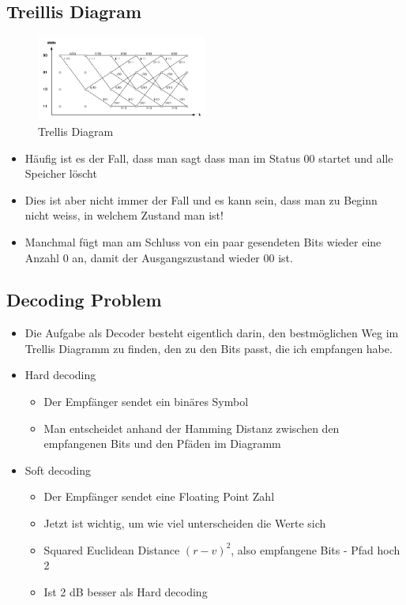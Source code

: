 \hypertarget{treillis-diagram}{%
\subsection{Treillis Diagram}\label{treillis-diagram}}

\begin{figure}[H]
\centering
\includegraphics[width=0.5\textwidth]{figures/trellis_diagram.png}
\caption{Trellis Diagram}
\end{figure}

\begin{itemize}
\tightlist
\item
  Häufig ist es der Fall, dass man sagt dass man im Status $00$ startet
  und alle Speicher löscht
\item
  Dies ist aber nicht immer der Fall und es kann sein, dass man zu
  Beginn nicht weiss, in welchem Zustand man ist!
\item
  Manchmal fügt man am Schluss von ein paar gesendeten Bits wieder eine
  Anzahl $0$ an, damit der Ausgangszustand wieder $00$ ist.
\end{itemize}

\hypertarget{decoding-problem}{%
\subsection{Decoding Problem}\label{decoding-problem}}

\begin{itemize}
\tightlist
\item
  Die Aufgabe als Decoder besteht eigentlich darin, den bestmöglichen
  Weg im Trellis Diagramm zu finden, den zu den Bits passt, die ich
  empfangen habe.
\item
  Hard decoding

  \begin{itemize}
  \tightlist
  \item
    Der Empfänger sendet ein binäres Symbol
  \item
    Man entscheidet anhand der Hamming Distanz zwischen den empfangenen
    Bits und den Pfäden im Diagramm
  \end{itemize}
\item
  Soft decoding

  \begin{itemize}
  \tightlist
  \item
    Der Empfänger sendet eine Floating Point Zahl
  \item
    Jetzt ist wichtig, um wie viel unterscheiden die Werte sich
  \item
    Squared Euclidean Distance $(r - v)^2$, also empfangene Bits - Pfad
    hoch 2
  \item
    Ist 2 dB besser als Hard decoding
  \end{itemize}
\end{itemize}

